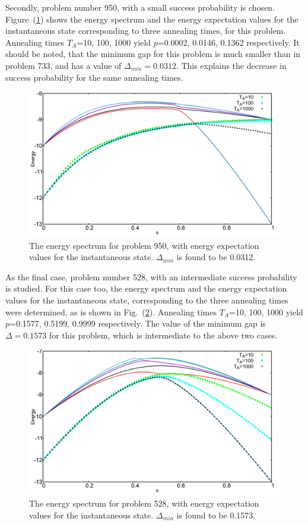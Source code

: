 \documentclass[../main.tex]{subfiles}
\begin{document}
Secondly, problem number 950, with a small success probability is chosen. Figure~(\ref{fig:o3}) shows the energy spectrum and the energy expectation values for the instantaneous state corresponding to three annealing times, for this problem. Annealing  times $T_A$=10, 100, 1000 yield $p$=0.0002, 0.0146, 0.1362 respectively. It should be noted, that the minimum gap for this problem is much smaller than in problem 733, and has a value of $\Delta_{min} = 0.0312$. This explains the decrease in success probability for the same annealing times.\\
\begin{figure}[H]
\centering 
\includegraphics[scale=0.24]{950_s12_O.png}
\caption{The energy spectrum for problem 950, with energy expectation values for the instantaneous state. $\Delta_{min}$ is found to be 0.0312.}
\label{fig:o3}
\end{figure}


As the final case, problem number 528, with an intermediate success probability is studied. For this case too, the energy spectrum and the energy expectation values for the instantaneous state, corresponding to the three annealing times were determined, as is shown in Fig.~(\ref{fig:o4}). Annealing times $T_A$=10, 100, 1000 yield $p$=0.1577, 0.5199, 0.9999 respectively. The value of the minimum gap is $\Delta=0.1573$ for this problem, which is intermediate to the above two cases. 
\begin{figure}[H]
\centering 
\includegraphics[scale=0.24]{528_s12_O.png}
\caption{The energy spectrum for problem 528, with energy expectation values for the instantaneous state. $\Delta_{min}$ is found to be 0.1573.}
\label{fig:o4}
\end{figure}
\end{document}
